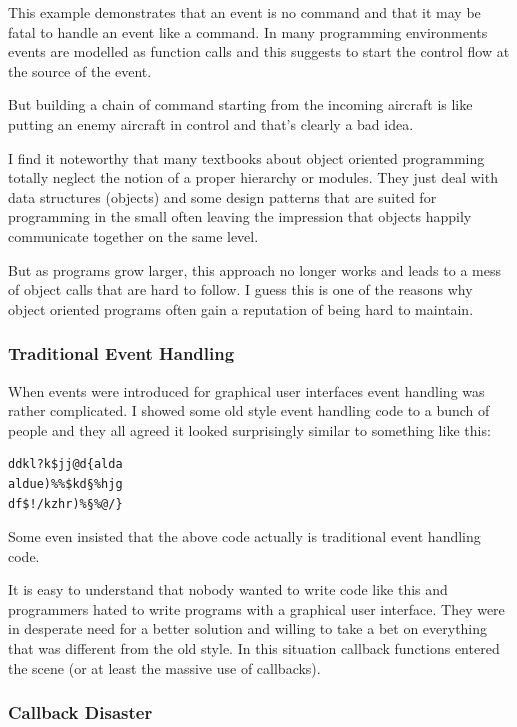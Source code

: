 This example demonstrates that an event is no command and that it may be
fatal to handle an event like a command. In many programming
environments events are modelled as function calls and this suggests to
start the control flow at the source of the event.

But building a chain of command starting from the incoming aircraft is
like putting an enemy aircraft in control and that's clearly a bad idea.

I find it noteworthy that many textbooks about object oriented
programming totally neglect the notion of a proper hierarchy or modules.
They just deal with data structures (objects) and some design patterns
that are suited for programming in the small often leaving the
impression that objects happily communicate together on the same level.

But as programs grow larger, this approach no longer works and leads to
a mess of object calls that are hard to follow. I guess this is one of
the reasons why object oriented programs often gain a reputation of
being hard to maintain.

\subsubsection{Traditional Event Handling}

When events were introduced for graphical user interfaces event handling
was rather complicated. I showed some old style event handling code to a
bunch of people and they all agreed it looked surprisingly similar to
something like this:

\begin{verbatim}
ddkl?k$jj@d{alda
aldue)%%$kd§%hjg
df$!/kzhr)%§%@/}
\end{verbatim}

Some even insisted that the above code actually is traditional event
handling code.

It is easy to understand that nobody wanted to write code like this and
programmers hated to write programs with a graphical user interface.
They were in desperate need for a better solution and willing to take a
bet on everything that was different from the old style. In this
situation callback functions entered the scene (or at least the massive
use of callbacks).

\subsubsection{\label{callbackdesaster}Callback Disaster}

